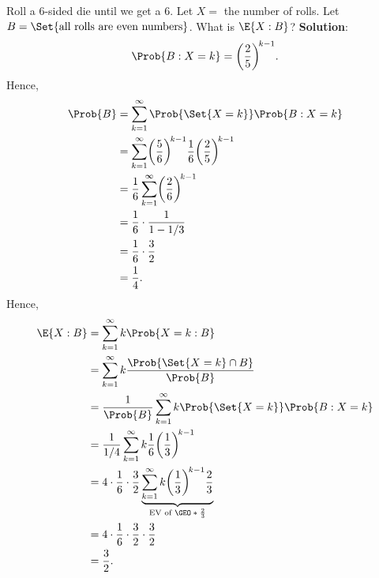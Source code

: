 \begin{Example}{}{}
    Roll a 6-sided die until we get a 6. Let $ X= $ the number of rolls.
    Let $ B=\Set{\text{all rolls are even numbers}} $.
    What is $ \E{X\given B} $?
    \tcblower{}
    \textbf{Solution}:
    \[ \Prob{B\given X=k}=\biggl(\frac{2}{5}\biggr)^{\!k-1}. \]
    Hence,
    \begin{align*}
        \Prob{B}
         & =\sum_{k=1}^{\infty}\Prob{\Set{X=k}}\Prob{B\given X=k}                                            \\
         & =\sum_{k=1}^{\infty}\biggl(\frac{5}{6}\biggr)^{\!k-1}\frac{1}{6}\biggl(\frac{2}{5}\biggr)^{\!k-1} \\
         & =\frac{1}{6}\sum_{k=1}^{\infty}\biggl(\frac{2}{6}\biggr)^{\!k-1}                                  \\
         & =\frac{1}{6}\cdot\frac{1}{1-1/3}                                                                  \\
         & =\frac{1}{6}\cdot\frac{3}{2}                                                                      \\
         & =\frac{1}{4}.
    \end{align*}
    Hence,
    \begin{align*}
        \E{X\given B}
         & =\sum_{k=1}^{\infty}k\Prob{X=k\given B}                                                                                                               \\
         & =\sum_{k=1}^{\infty}k \frac{\Prob{\Set{X=k}\cap B}}{\Prob{B}}                                                                                         \\
         & =\frac{1}{\Prob{B}}\sum_{k=1}^{\infty}k \Prob{\Set{X=k}}\Prob{B\given X=k}                                                                            \\
         & =\frac{1}{1/4}\sum_{k=1}^{\infty}k \frac{1}{6}\biggl(\frac{1}{3}\biggr)^{\!k-1}                                                                       \\
         & =4\cdot \frac{1}{6}\cdot \frac{3}{2}\underbrace{\sum_{k=1}^{\infty}k\biggl(\frac{1}{3}\biggr)^{\!k-1}\frac{2}{3}}_{\text{EV of $\GEO*{\frac{2}{3}}$}} \\
         & =4\cdot \frac{1}{6}\cdot \frac{3}{2}\cdot \frac{3}{2}                                                                                                 \\
         & =\frac{3}{2}.
    \end{align*}
\end{Example}
